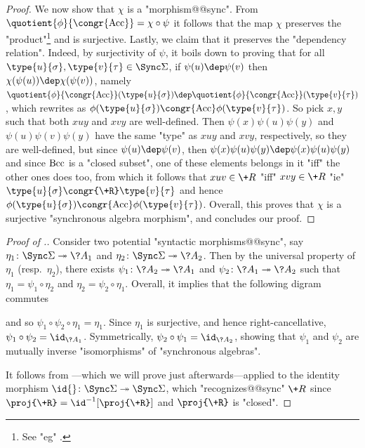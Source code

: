 \begin{proof}
	We now show that $\chi$ is a "morphism@@sync".
	From $\quotient{\phi}{\congr{\Acc}} = \chi \circ \psi$ it follows that
	the map $\chi$ preserves the "product"\footnote{See "eg" \cite[Lemma 3.2, p.~10]{bojanczyk_recognisable_2015}.} and is surjective.
	Lastly, we claim that it preserves the "dependency relation". Indeed,
	by surjectivity of $\psi$, it boils down to proving that
	for all $\type{u}{\sigma}, \type{v}{\tau} \in \Sync\Sigma$, if $\psi(u) \dep \psi(v)$ then
	$\chi(\psi(u)) \dep \chi(\psi(v))$, namely $\quotient{\phi}{\congr{\Acc}}(\type{u}{\sigma}) \dep
	\quotient{\phi}{\congr{\Acc}}(\type{v}{\tau})$, which
	rewrites as $\phi(\type{u}{\sigma}) \congr{\Acc} \phi(\type{v}{\tau})$.
	So pick $x, y$ such that both $xuy$ and $xvy$ are well-defined. Then
	$\psi(x)\psi(u)\psi(y)$ and $\psi(u)\psi(v)\psi(y)$ have the same "type"
	as $xuy$ and $xvy$, respectively, so they are well-defined,
	but since $\psi(u) \dep \psi(v)$, then $\psi(x)\psi(u)\psi(y) \dep \psi(x)\psi(u)\psi(y)$
	and since $\textrm{Bcc}$ is a "closed subset", one of these elements belongs in
	it "iff" the other ones does too, from which it follows
	that $xuv \in \+R$ "iff" $xvy \in \+R$ "ie" $\type{u}{\sigma} \congr{\+R} \type{v}{\tau}$
	and hence $\phi(\type{u}{\sigma}) \congr{\Acc} \phi(\type{v}{\tau})$.
	Overall, this proves that $\chi$ is a surjective "synchronous algebra morphism",
	and concludes our proof.
\end{proof}

\begin{proof}[Proof of .]
	 Consider two potential "syntactic morphisms@@sync",
	say $\eta_1\colon \Sync\Sigma \surj \?A_1$ and $\eta_2\colon \Sync\Sigma \surj \?A_2$.
	Then by the universal property of $\eta_1$ (resp.~$\eta_2$), there exists
	$\psi_1\colon \?A_2 \surj \?A_1$ and $\psi_2\colon \?A_1 \surj \?A_2$ such that
	$\eta_1 = \psi_1 \circ \eta_2$ and $\eta_2 = \psi_2 \circ \eta_1$. Overall, it implies that
	the following digram commutes
	\begin{center}
	\end{center}
	and so $\psi_1\circ \psi_2 \circ \eta_1 = \eta_1$. Since $\eta_1$
	is surjective, and hence right-cancellative, $\psi_1\circ \psi_2 = \id_{\?A_1}$.
	Symmetrically, $\psi_2 \circ \psi_1 = \id_{\?A_2}$, showing that
	$\psi_1$ and $\psi_2$ are mutually inverse "isomorphisms" of "synchronous algebras".

	 It follows from ---which we will prove
	just afterwards---applied to the identity morphism $\id{}\colon \Sync\Sigma \surj \Sync\Sigma$,
	which "recognizes@@sync" $\+R$ since $\proj{\+R} = \id^{-1}[\proj{\+R}]$ and $\proj{\+R}$
	is "closed".
\end{proof}

